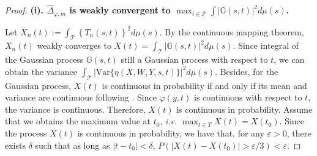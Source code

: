 \documentclass[
  12pt]{article}
\def\cT{\mathcal{T}}
\begin{document}
\girdhypothesis*
\begin{proof}
\textbf{(i). $\widehat{\Delta}_{\varphi ,m}$ is weakly convergent to $\max_{t \in \cT}\int{| \mathbb{G}(s,t)|^2d\mu(s)}$.}

    Let $X_n(t):=\int_{\mathcal{T}}{\left\{ T_n(s,t) \right\}^2d\mu (s)}$. By the continuous mapping theorem, $X_n(t)$ weakly converges to $X(t)=\int_{\cT}{\left| \mathbb{G}(s,t) \right|^2d\mu(s)}$. Since
      integral of the Gaussian process $\mathbb{G}(s,t)$ still a Gaussian process with respect to $t$, we can obtain the variance $\int_{\mathcal{T}}{\left| \mathrm{Var}\{\eta (X,W,Y,s,t)\} \right|^2d\mu (s)}$. Besides, for the Gaussian process, $X(t)$ is continuous in probability if and only if its mean and variance are continuous following \cite{seeger2004gaussian}. Since $\varphi(y,t)$ is continuous with respect to $t$, the variance is continuous. Therefore, $X(t)$ is continuous in probability. Assume that we obtains the maximum value at $t_0$, \emph{i.e.} $\max_{t\in T}X(t) =X(t_0) $. Since the process $X(t)$ is continuous in probability, we have that, for any $\varepsilon > 0$, there exists $\delta$ such that as long as $|t - t_0| < \delta$, $P(|X(t) - X(t_0)| > \varepsilon/3) < \varepsilon$. 
      

\end{proof}
\end{document}
